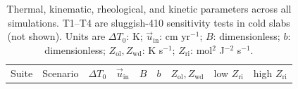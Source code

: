 \documentclass[draft,linenumbers]{agujournal2019}
\begin{document}
\begin{longtable}[]{@{}
  >{\raggedright\arraybackslash}p{}
  >{\raggedleft\arraybackslash}p{}
  >{\raggedleft\arraybackslash}p{}
  >{\raggedleft\arraybackslash}p{}
  >{\raggedleft\arraybackslash}p{}
  >{\raggedleft\arraybackslash}p{}
  >{\raggedleft\arraybackslash}p{}
  >{\raggedleft\arraybackslash}p{}
  >{\raggedleft\arraybackslash}p{}@{}}
\caption{Thermal, kinematic, rheological, and kinetic parameters across
all simulations. T1--T4 are sluggish-410 sensitivity tests in cold slabs
(not shown). Units are \(\Delta T_0\): K; \(\vec{u}_\mathrm{in}\): cm
yr\(^{-1}\); \(B\): dimensionless; \(b\): dimensionless;
\(Z_\mathrm{ol}, Z_\mathrm{wd}\): K s\(^{-1}\); \(Z_\mathrm{ri}\):
mol\(^2\) J\(^{-2}\) s\(^{-1}\).}\label{tbl:scenarios}\tabularnewline
\toprule\noalign{}
\begin{minipage}[b]{\linewidth}\raggedright
Suite
\end{minipage} & \begin{minipage}[b]{\linewidth}\raggedleft
Scenario
\end{minipage} & \begin{minipage}[b]{\linewidth}\raggedleft
\(\Delta T_0\)
\end{minipage} & \begin{minipage}[b]{\linewidth}\raggedleft
\(\vec{u}_\mathrm{in}\)
\end{minipage} & \begin{minipage}[b]{\linewidth}\raggedleft
\(B\)
\end{minipage} & \begin{minipage}[b]{\linewidth}\raggedleft
\(b\)
\end{minipage} & \begin{minipage}[b]{\linewidth}\raggedleft
\(Z_\mathrm{ol},Z_\mathrm{wd}\)
\end{minipage} & \begin{minipage}[b]{\linewidth}\raggedleft
low \(Z_\mathrm{ri}\)
\end{minipage} & \begin{minipage}[b]{\linewidth}\raggedleft
high \(Z_\mathrm{ri}\)
\end{minipage} \\

\end{longtable}
\end{document}
